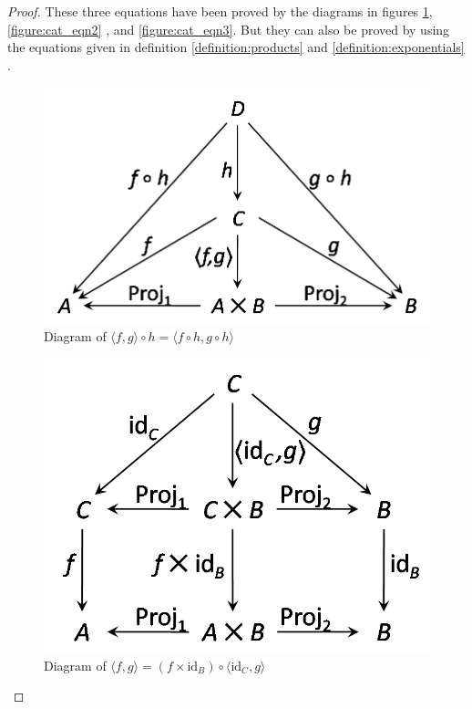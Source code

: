 \begin{proof}
These three equations have been proved by the diagrams in figures \ref{figure:cat_eqn1}, \ref{figure:cat_eqn2} , and \ref{figure:cat_eqn3}. But they can also be proved by using the equations given in definition \ref{definition:products} and \ref{definition:exponentials} .

\begin{figure}[h!]
\centering
\includegraphics[scale=0.48]{./images/cat_eqn1}
\caption{Diagram of $ \langle f,g \rangle \circ h = \langle f \circ h , g \circ h \rangle $}
\label{figure:cat_eqn1}
\end{figure}
\begin{figure}[h!]
\centering
\includegraphics[scale=0.48]{./images/cat_eqn2}
\caption{Diagram of $ \langle f,g \rangle = ( f \times \text{id}_B ) \circ \langle \text{id}_C , g \rangle $}

\end{figure}
\end{proof}
